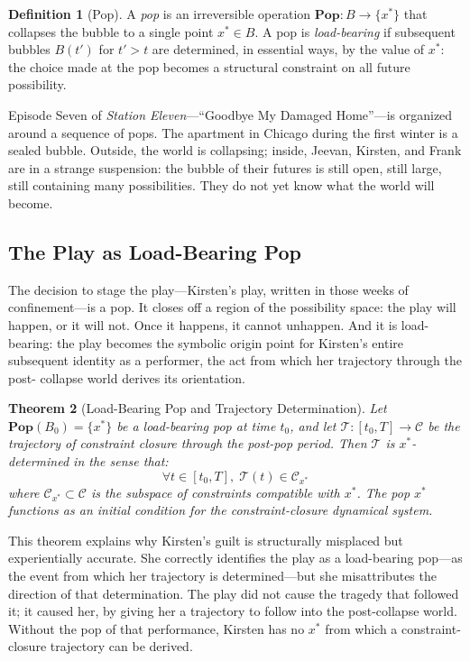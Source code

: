 \documentclass[12pt, oneside]{article}
\theoremstyle{plain}
\newtheorem{theorem}{Theorem}[section]
\theoremstyle{definition}
\newtheorem{definition}[theorem]{Definition}
\theoremstyle{remark}
\newcommand{\Pop}{\mathbf{Pop}}
\newcommand{\Traj}{\mathcal{T}}
\newcommand{\CC}{\mathcal{C}}
\begin{document}
\begin{definition}[Pop]
\label{def:pop}
A \emph{pop} is an irreversible operation $\Pop : B \to \{x^*\}$
that collapses the bubble to a single point $x^* \in B$. A pop is
\emph{load-bearing} if subsequent bubbles $B(t')$ for $t' > t$ are
determined, in essential ways, by the value of $x^*$: the choice made
at the pop becomes a structural constraint on all future possibility.
\end{definition}

Episode Seven of \textit{Station Eleven}---``Goodbye My Damaged
Home''---is organized around a sequence of pops. The apartment in
Chicago during the first winter is a sealed bubble. Outside, the
world is collapsing; inside, Jeevan, Kirsten, and Frank are in a
strange suspension: the bubble of their futures is still open,
still large, still containing many possibilities. They do not yet
know what the world will become.

\subsection{The Play as Load-Bearing Pop}

The decision to stage the play---Kirsten's play, written in those
weeks of confinement---is a pop. It closes off a region of the
possibility space: the play will happen, or it will not. Once it
happens, it cannot unhappen. And it is load-bearing: the play becomes
the symbolic origin point for Kirsten's entire subsequent identity
as a performer, the act from which her trajectory through the post-
collapse world derives its orientation.

\begin{theorem}[Load-Bearing Pop and Trajectory Determination]
\label{thm:loadbearing}
Let $\Pop(B_0) = \{x^*\}$ be a load-bearing pop at time $t_0$,
and let $\Traj : [t_0, T] \to \CC$ be the trajectory of constraint
closure through the post-pop period. Then $\Traj$ is
$x^*$-determined in the sense that:
\[
  \forall t \in [t_0, T],\; \Traj(t) \in \CC_{x^*}
\]
where $\CC_{x^*} \subset \CC$ is the subspace of constraints
compatible with $x^*$. The pop $x^*$ functions as an initial
condition for the constraint-closure dynamical system.
\end{theorem}

This theorem explains why Kirsten's guilt is structurally
misplaced but experientially accurate. She correctly identifies
the play as a load-bearing pop---as the event from which her
trajectory is determined---but she misattributes the direction of
that determination. The play did not cause the tragedy that
followed it; it caused her, by giving her a trajectory to follow
into the post-collapse world. Without the pop of that performance,
Kirsten has no $x^*$ from which a constraint-closure trajectory
can be derived.
\end{document}
